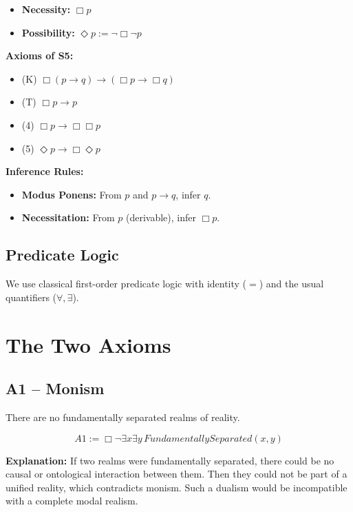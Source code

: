 \documentclass[
]{article}
\begin{document}
\begin{itemize}
\item \textbf{Necessity:} \(\Box p\)
\item \textbf{Possibility:} \(\Diamond p := \neg\Box\neg p\)
\end{itemize}

\textbf{Axioms of S5:}
\begin{itemize}
\item (K) \(\Box(p \rightarrow q) \rightarrow (\Box p \rightarrow \Box q)\)
\item (T) \(\Box p \rightarrow p\)
\item (4) \(\Box p \rightarrow \Box\Box p\)
\item (5) \(\Diamond p \rightarrow \Box\Diamond p\)
\end{itemize}

\textbf{Inference Rules:}
\begin{itemize}
\item \textbf{Modus Ponens:} From \(p\) and \(p \rightarrow q\), infer \(q\).
\item \textbf{Necessitation:} From \(p\) (derivable), infer \(\Box p\).
\end{itemize}

\subsection{Predicate Logic}\label{predicate-logic}

We use classical first-order predicate logic with identity (\(=\)) and the usual quantifiers (\(\forall, \exists\)).

\section{The Two Axioms}\label{the-two-axioms}

\subsection{A1 – Monism}\label{a1-monism}

There are no fundamentally separated realms of reality.

\[
\boxed{A1 := \Box\neg\exists x\exists y\, FundamentallySeparated(x,y)}
\]

\textbf{Explanation:} If two realms were fundamentally separated, there could be no causal or ontological interaction between them. Then they could not be part of a unified reality, which contradicts monism. Such a dualism would be incompatible with a complete modal realism.
\end{document}
